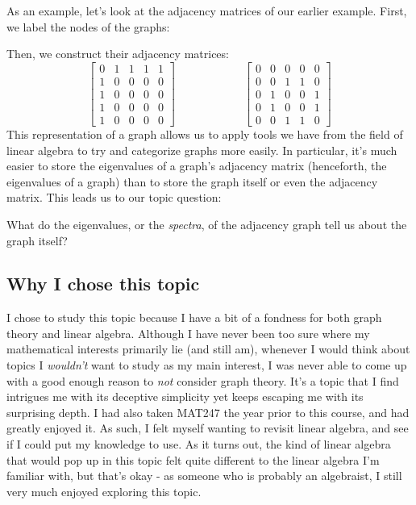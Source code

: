 \documentclass{article}
\begin{document}
As an example, let's look at the adjacency matrices of our earlier example.
First, we label the nodes of the graphs:
\begin{figure}[ht]
\centering
{}
\end{figure}
\newpage
Then, we construct their adjacency matrices:
\begin{equation*}
    \begin{bmatrix} 0 & 1 & 1 & 1 & 1 \\ 1 & 0 & 0 & 0 & 0 \\ 1 & 0 & 0 & 0 & 0 \\ 1 & 0 & 0 & 0 & 0 \\ 1 & 0 & 0 & 0 & 0 \end{bmatrix} \qquad \qquad \qquad
    \begin{bmatrix} 0 & 0 & 0 & 0 & 0 \\ 0 & 0 & 1 & 1 & 0 \\ 0 & 1 & 0 & 0 & 1 \\ 0 & 1 & 0 & 0 & 1 \\ 0 & 0 & 1 & 1 & 0 \end{bmatrix}
\end{equation*}
This representation of a graph allows us to apply tools we have from the field of linear algebra to try and categorize graphs more easily.
In particular, it's much easier to store the eigenvalues of a graph's adjacency matrix (henceforth, the eigenvalues of a graph) than to store the graph itself or even the adjacency matrix.
This leads us to our topic question:

\begin{qu}[title=The Big Question]
What do the eigenvalues, or the \textit{spectra}, of the adjacency graph tell us about the graph itself?
\end{qu}

\subsection{Why I chose this topic}

I chose to study this topic because I have a bit of a fondness for both graph theory and linear algebra.
Although I have never been too sure where my mathematical interests primarily lie (and still am),
whenever I would think about topics I \textit{wouldn't} want to study as my main interest, I was never able to
come up with a good enough reason to \textit{not} consider graph theory.
It's a topic that I find intrigues me with its deceptive simplicity yet keeps escaping me with its surprising depth. \vsp
I had also taken MAT247 the year prior to this course, and had greatly enjoyed it.
As such, I felt myself wanting to revisit linear algebra, and see if I could put my knowledge to use.
As it turns out, the kind of linear algebra that would pop up in this topic felt quite different to the linear algebra I'm familiar with,
but that's okay - as someone who is probably an algebraist, I still very much enjoyed exploring this topic.
\end{document}
